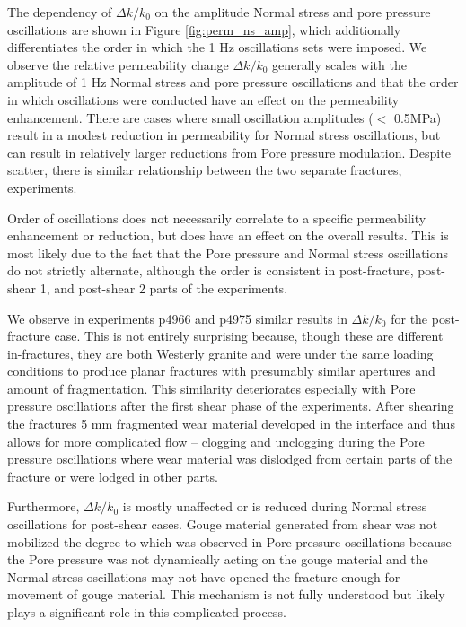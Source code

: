 The dependency of $ \Delta k/k_0 $ on the amplitude Normal stress and pore pressure oscillations are shown in Figure \ref{fig:perm_ns_amp}, which additionally differentiates the order in which the 1 Hz oscillations sets were imposed. We observe the relative permeability change $ \Delta k/k_0 $ generally scales with the amplitude of 1 Hz Normal stress and pore pressure oscillations and that the order in which oscillations were conducted have an effect on the permeability enhancement. There are cases where small oscillation amplitudes ($< $ 0.5MPa) result in a modest reduction in permeability for Normal stress oscillations, but can result in relatively larger reductions from Pore pressure modulation. Despite scatter, there is similar relationship between the two separate fractures, experiments. 

Order of oscillations does not necessarily correlate to a specific permeability enhancement or reduction, but does have an effect on the overall results. This is most likely due to the fact that the Pore pressure and Normal stress oscillations do not strictly alternate, although the order is consistent in post-fracture, post-shear 1, and post-shear 2 parts of the experiments. 

We observe in experiments p4966 and p4975 similar results in $ \Delta k/k_0 $ for the post-fracture case. This is not entirely surprising because, though these are different in-fractures, they are both Westerly granite and were under the same loading conditions to produce planar fractures with presumably similar apertures and amount of fragmentation. This similarity deteriorates especially with Pore pressure oscillations after the first shear phase of the experiments. After shearing the fractures 5 mm fragmented wear material developed in the interface and thus allows for more complicated flow -- clogging and unclogging during the Pore pressure oscillations where wear material was dislodged from certain parts of the fracture or were lodged in other parts.  

Furthermore, $ \Delta k/k_0 $ is mostly unaffected or is reduced during Normal stress oscillations for post-shear cases. Gouge material generated from shear was not mobilized the degree to which was observed in Pore pressure oscillations because the Pore pressure was not dynamically acting on the gouge material and the Normal stress oscillations may not have opened the fracture enough for movement of gouge material. This mechanism is not fully understood but likely plays a significant role in this complicated process.

